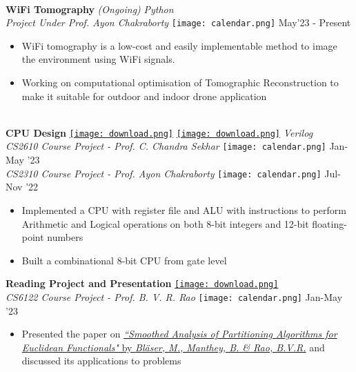 \documentclass[10pt,article]{article}
\newcommand{\myMargin}{0.2in}
\newcommand{\resheading}[1]{{\small \colorbox{myblue} { \begin{minipage}{\dimexpr\linewidth-2\fboxsep}\centering{\textbf{#1 \vphantom{p\^{E}}}}\end{minipage}}}}
\newcommand{\myfont}[2]{\fontsize{#1}{#1}\selectfont #2}
\newcommand{\subheadingfont}[1]{\myfont{11pt}{#1}}
\newcommand{\projecttopic}[1]{\myfont{11pt}{\textbf{#1}}}
\newcommand{\projectdesc}[1]{\myfont{10pt}{\textcolor{projDescColor}{\textit{#1}}}}
\newcommand{\mylink}[1]{\href{#1}{\texttt{[image: download.png]}}}
\newcommand{\mycal}[1]{\texttt{[image: calendar.png]} \myfont{10}{#1}}
\begin{document}

\begin{multicols*}{2}
\noindent
\resheading{\subheadingfont{PROJECTS} }\\[0.1cm]

\noindent
\projecttopic{WiFi Tomography} \textit{\myfont{9pt}{(Ongoing)}} \hfill \textcolor{projDescColor}{\textit{Python}}  \\
\projectdesc{Project Under Prof. Ayon Chakraborty} \hfill \mycal{May'23 - Present} 
\begin{itemize}[nolistsep, leftmargin=\myMargin]
    \item WiFi tomography is a low-cost and easily implementable method to image the environment using WiFi signals.
    \item Working on computational optimisation of Tomographic Reconstruction to make it suitable for outdoor
        and indoor drone application 
\end{itemize} 
\vspace{5pt}

\noindent
\hrulefill \\ [-0.5cm]
\projecttopic{CPU Design} \mylink{https://github.com/Snehadeep-Gayen/Computer-Organisation-and-Architecture-Lab} 
\mylink{https://github.com/Snehadeep-Gayen/Simple_CPU_Design} 
\hfill    \textcolor{projDescColor}{\textit{Verilog}}  \\
\projectdesc{CS2610 Course Project - Prof. C. Chandra Sekhar} \hfill \mycal{Jan-May '23} \\
\projectdesc{CS2310 Course Project - Prof. Ayon Chakraborty} \hfill \mycal{Jul-Nov '22}
\noindent
\begin{itemize}[nolistsep, leftmargin=\myMargin]
    \item Implemented a CPU with register file and ALU with instructions to perform Arithmetic 
    and Logical operations on both 8-bit integers and  12-bit floating-point numbers
    \item Built a combinational 8-bit CPU from gate level
\end{itemize}

\noindent
\projecttopic{Reading Project and Presentation} \mylink{https://docs.google.com/presentation/d/11JGNKZnVHHQ-aGJLIgkdXcnK5qy_xisO/edit?usp=sharing&ouid=111499804735475673896&rtpof=true&sd=true} \\
\projectdesc{CS6122 Course Project - Prof. B. V. R. Rao} \hfill \mycal{Jan-May '23} 
\begin{itemize}[noitemsep, nolistsep, leftmargin=\myMargin]
    \item Presented the paper on \href{https://doi.org/10.1007/s00453-012-9643-5}{\textit{``Smoothed Analysis of Partitioning Algorithms for Euclidean Functionals"} 
    by \textit{Bläser, M., Manthey, B. \& Rao, B.V.R.}} and discussed its applications to problems
\end{itemize}


\end{multicols*}
\end{document}
